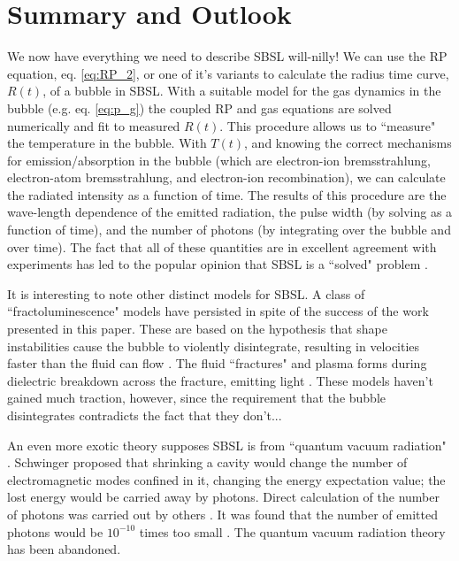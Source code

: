 \documentclass[11pt,prb,aps,nofootinbib,superscriptaddress,floatfix]{revtex4-2}
\begin{document}
\section{Summary and Outlook}
We now have everything we need to describe SBSL will-nilly! We can use the RP equation, eq. \ref{eq:RP_2}, or one of it's variants to calculate the radius time curve, $R(t)$, of a bubble in SBSL. With a suitable model for the gas dynamics in the bubble (e.g. eq. \ref{eq:p_g}) the coupled RP and gas equations are solved numerically and fit to measured $R(t)$. This procedure allows us to ``measure" the temperature in the bubble. With $T(t)$, and knowing the correct mechanisms for emission/absorption in the bubble (which are electron-ion bremsstrahlung, electron-atom bremsstrahlung, and electron-ion recombination), we can calculate the radiated intensity as a function of time. The results of this procedure are the wave-length dependence of the emitted radiation, the pulse width (by solving as a function of time), and the number of photons (by integrating over the bubble and over time). The fact that all of these quantities are in excellent agreement with experiments has led to the popular opinion that SBSL is a ``solved" problem \cite{yasui2018acoustic,lohse2018bubble}.

It is interesting to note other distinct models for SBSL. A class of ``fractoluminescence" models have persisted in spite of the success of the work presented in this paper. These are based on the hypothesis that shape instabilities cause the bubble to violently disintegrate, resulting in velocities faster than the fluid can flow \cite{prosperetti1997new}. The fluid ``fractures" and plasma forms during dielectric breakdown across the fracture, emitting light \cite{borisenok2020mechanisms,borissenok2008sonoluminescence}. These models haven't gained much traction, however, since the requirement that the bubble disintegrates contradicts the fact that they don't...

An even more exotic theory supposes SBSL is from ``quantum vacuum radiation" \cite{schwinger1992casimir1,schwinger1992casimir2,schwinger1993casimir1,schwinger1993casimir2,schwinger1993casimir3,schwinger1993casimir4,schwinger1994casimir}. Schwinger proposed that shrinking a cavity would change the number of electromagnetic modes confined in it, changing the energy expectation value; the lost energy would be carried away by photons. Direct calculation of the number of photons was carried out by others \cite{eberlein1996sonoluminescence}. It was found that the number of emitted photons would be $10^{-10}$ times too small \cite{unnikrishnan1996comment,lambrecht1997comment,garcia1997comment,milton1996comment,liberati2000sonoluminescence}. The quantum vacuum radiation theory has been abandoned.
\end{document}
